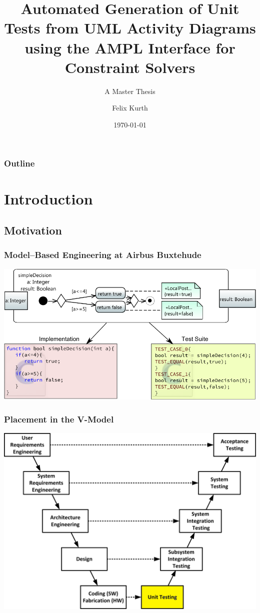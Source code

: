 \documentclass{beamer}
\title[Automated Generation of Unit Tests]{Automated Generation of Unit Tests from UML Activity Diagrams using the AMPL Interface for Constraint Solvers}
\subtitle[M.Sc. Thesis]{A Master Thesis}
\author[F. Kurth]{Felix Kurth}
\date[Jan 2014]{\today}
\begin{document}
\begin{frame}
\titlepage
\end{frame}

\begin{frame}
\frametitle{Outline} 
\tableofcontents  
\end{frame}


\section{Introduction}
\subsection{Motivation}
\begin{frame}
\frametitle{Model--Based Engineering at Airbus Buxtehude}
\includegraphics[width=\textwidth]{../Thesis/pics/BasicExamplesSimpleDecision.pdf}
\end{frame}
\begin{frame}
\frametitle{Placement in the V-Model}
\includegraphics[width=\textwidth,height=0.8\textheight]{./pics/V-model.jpg}
\end{frame}
\end{document}
